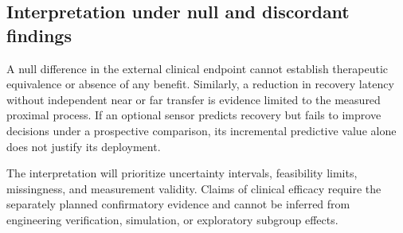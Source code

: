 \subsection{Interpretation under null and discordant findings}

A null difference in the external clinical endpoint cannot establish therapeutic equivalence or absence of any benefit. Similarly, a reduction in recovery latency without independent near or far transfer is evidence limited to the measured proximal process. If an optional sensor predicts recovery but fails to improve decisions under a prospective comparison, its incremental predictive value alone does not justify its deployment.

The interpretation will prioritize uncertainty intervals, feasibility limits, missingness, and measurement validity. Claims of clinical efficacy require the separately planned confirmatory evidence and cannot be inferred from engineering verification, simulation, or exploratory subgroup effects.
